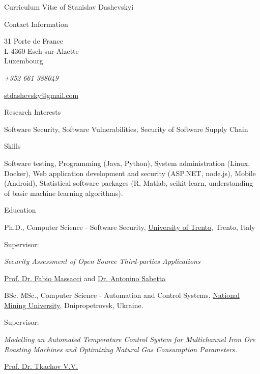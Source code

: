 \documentclass[11pt]{custom-style}
\providecommand*\email[1]{\href{mailto:#1}{#1}}
\begin{document}
\begin{cv}{Curriculum Vit\ae{} of Stanislav Dashevskyi}
  \begin{cvlist}{Contact Information}
    \item 31 Porte de France\\
        L-4360 Esch-sur-Alzette\\
        Luxembourg
    \item \textit{+352 661 388049}
      \item \email{stdashevsky@gmail.com}
  \end{cvlist}

  \begin{cvlist}{Research Interests}
  \item Software Security, Software Vulnerabilities, 
    Security of Software Supply Chain
  \end{cvlist}

  \begin{cvlist}{Skills}
  \item Software testing, Programming (Java, Python), System administration (Linux, Docker), Web application development
      and security (ASP.NET, node.js), Mobile (Android), Statistical software packages (R, Matlab, scikit-learn,
      understanding of basic machine learning algorithms).
  \end{cvlist}

  \begin{cvlist}{Education}
  \item[2017] Ph.D., Computer Science - Software Security,
    \href{http://www.unitn.it/en}{University of Trento}, Trento, Italy
    \begin{labeling}{Supervisor:}
    \item[Thesis:] \emph{Security Assessment of Open Source
        Third-parties Applications}
    \item[Supervisors:] \href{http://disi.unitn.it/~massacci/}
      {Prof. Dr. Fabio Massacci} and \href{https://www.sabetta.com/}
      {Dr. Antonino Sabetta}
    \end{labeling}
  \item[2010] BSc. MSc., Computer Science - Automation and Control
    Systems, \href{http://www.nmu.org.ua/en/}{National Mining
      University}, Dnipropetrovsk, Ukraine.
    \begin{labeling}{Supervisor:}
    \item[Thesis:] \emph{Modelling an Automated Temperature Control
        System for Multichannel Iron Ore Roasting Machines and
        Optimizing Natural Gas Consumption Parameters.}
    \item[Supervisor:]
      \href{http://aks.nmu.org.ua/en/Dep_ACS/Tkachev.php}
      {Prof. Dr. Tkachov V.V.}
    \end{labeling}
  \end{cvlist}


\end{cv}
\end{document}
